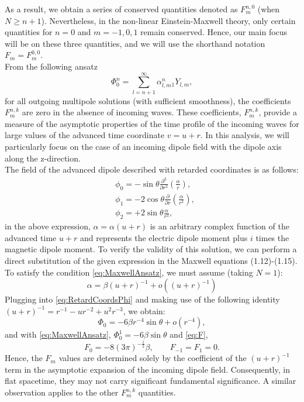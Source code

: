 As a result, we obtain a series of conserved quantities denoted as $F_{m}^{n,0}$ (when $N \geq n+1$). Nevertheless, in the non-linear Einstein-Maxwell theory, only certain quantities for $n = 0$ and $m = -1, 0, 1$ remain conserved. Hence, our main focus will be on these three quantities, and we will use the shorthand notation $F_{m} = F_{m}^{0,0}$.\\
From the following ansatz
\begin{equation}\label{eq:Phi0ansatz}
  \Phi_{0}^{n} = \sum_{l = n+1}^{\infty}\alpha_{l,m}^{n} {_{1}Y_{l,m}},
\end{equation}
for all outgoing multipole solutions (with sufficient smoothness), the coefficients $F_{m}^{n,k}$ are zero in the absence of incoming waves. These coefficients, $F_{m}^{n,k}$, provide a measure of the asymptotic properties of the time profile of the incoming waves for large values of the advanced time coordinate $v = u + r$. In this analysis, we will particularly focus on the case of an incoming dipole field with the dipole axis along the z-direction.\\
The field of the advanced dipole described with retarded coordinates is as follows:
\begin{align}\label{eq:RetardCoordsPhi}
  & \phi_{0} = -\sin\theta \frac{\partial^{2}}{\partial r^{2}}\left(\frac{\alpha}{r}\right), \nonumber \\ 
  & \phi_{1} = -2 \cos\theta \frac{\partial}{\partial r}\left(\frac{\alpha}{r^2}\right), \nonumber \\ 
  & \phi_{2} = +2 \sin\theta \frac{\alpha}{r^{3}},
\end{align}
in the above expression, $\alpha = \alpha(u + r)$ is an arbitrary complex function of the advanced time $u + r$ and represents the electric dipole moment plus $i$ times the magnetic dipole moment.
To verify the validity of this solution, we can perform a direct substitution of the given expression in the Maxwell equations (1.12)-(1.15). To satisfy the condition \eqref{eq:MaxwellAnsatz}, we must assume (taking $N = 1$):
$$\alpha = \beta(u+r)^{-1} + o((u+r)^{-1})$$
Plugging into \eqref{eq:RetardCoordsPhi} and making use of the following identity $(u+r)^{-1} = r^{-1}-ur^{-2}+u^{2}r^{-3}$, we obtain:
\begin{equation}\label{eq:Phi0retard}
  \Phi_{0} = -6\beta r^{-4}\sin\theta + o(r^{-4}),
\end{equation}
and with \eqref{eq:MaxwellAnsatz}, $\Phi_{0}^{1} = -6\beta \sin\theta$ and \eqref{eq:F}, $$F_{0} = -8(3\pi)^{-\frac{1}{2}}\beta, \qquad F_{-1} = F_{1} = 0.$$
Hence, the $F_m$ values are determined solely by the coefficient of the $(u + r)^{-1}$ term in the asymptotic expansion of the incoming dipole field. Consequently, in flat spacetime, they may not carry significant fundamental significance. A similar observation applies to the other $F_{m}^{n,k}$ quantities.\\

